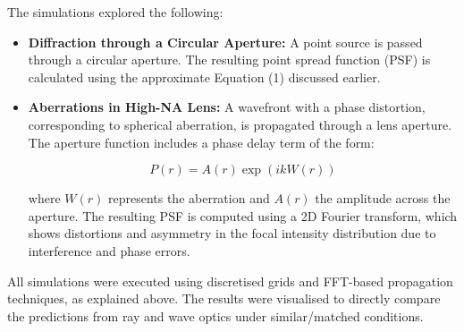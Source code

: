 \begin{multicols}{2}
\medskip
The simulations explored the following:

\begin{itemize}
\item \textbf{Diffraction through a Circular Aperture:} A point source is passed through a circular aperture. The resulting point spread function (PSF) is calculated using the approximate Equation (1) discussed earlier.


\item \textbf{Aberrations in High-NA Lens:} A wavefront with a phase distortion, corresponding to spherical aberration, is propagated through a lens aperture. The aperture function includes a phase delay term of the form:

\[
P(r) = A(r) \exp\left(i k W(r)\right)     
\]

where $W(r)$ represents the aberration and $A(r)$ the amplitude across the aperture. The resulting PSF is computed using a 
2D Fourier transform, which shows distortions and asymmetry in the focal intensity distribution due to interference and phase errors.
\end{itemize}

All simulations were executed using discretised grids and FFT-based propagation techniques, as explained above. 
The results were visualised to directly compare the predictions from ray and wave optics under similar/matched conditions.
\end{multicols}
